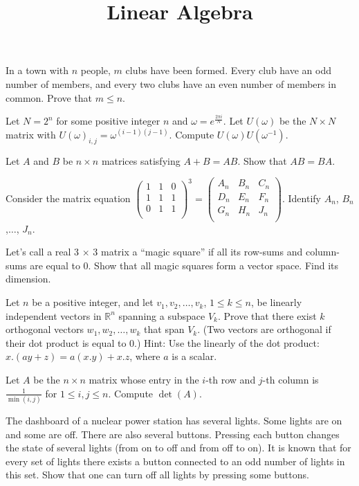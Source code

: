 \documentclass{article}
\begin{document}
\title{Linear Algebra}
\author{}
\date{}
\maketitle

In a town with \(n\) people, \(m\) clubs have been formed. Every club have an odd number of members, and every two clubs have an even number of members
in common. Prove that \(m \leq  n\).

Let \(N=2^n\) for some positive integer \(n\) and \(\omega =e^{\frac{2\pi  i}{N}}\). { } Let \(U(\omega )\) be the \(N\times N\) matrix with \(U(\omega
)_{i,j}= \omega ^{(i-1)(j-1)}\). { } Compute { }\(U(\omega )U\left(\omega ^{-1}\right)\).

Let \(A\) and \(B\) be \(n\times n\) matrices satisfying \(A+B = A B\). Show that \(A B = B A\).

 Consider the matrix equation \(\left(
\begin{array}{ccc}
 1 & 1 & 0 \\
 1 & 1 & 1 \\
 0 & 1 & 1 \\
\end{array}
\right)^3=\left(
\begin{array}{ccc}
 A_n & B_n & C_n \\
 D_n & E_n & F_n \\
 G_n & H_n & J_n \\
\end{array}
\right)\). { } Identify \(A_n\), \(B_n\),$\ldots $, \(J_n\).

Let{'}s call a real 3 $\times $ 3 matrix a {``}magic square{''} if all its row-sums and column-sums are equal to 0. Show that all magic squares form
a vector space. Find its dimension.

Let \(n\) be a positive integer, and let \(v_1, v_2, \ldots ,v_k\), \(1\leq k\leq n\), be linearly independent vectors in \(\mathbb{R}^n\) spanning
a subspace \(V_k\). { }Prove that there exist \(k\) { }orthogonal vectors \(w_1, w_2, \ldots ,w_k\) that span \(V_k\). { } (Two vectors are orthogonal
if their dot product is equal to 0.) { }Hint: { }Use the linearly of the dot product: { }\(x.(a y+z) = a(x.y)+x.z\), where \(a\) is a scalar.

Let \(A\) be the \(n\times n\) matrix whose entry in the \(i\)-th row and \(j\)-th column is { }\(\frac{1}{\min (i,j)}\) { }for \(1 \leq  i,j \leq
 n\). Compute \(\det (A)\).

The dashboard of a nuclear power station has several lights. Some lights are on and some are off. There are also several buttons. Pressing each button
changes the state of several lights (from on to off and from off to on). It is known that for every set of lights there exists a button connected
to an odd number of lights in this set. Show that one can turn off all lights by pressing some buttons.
\end{document}
